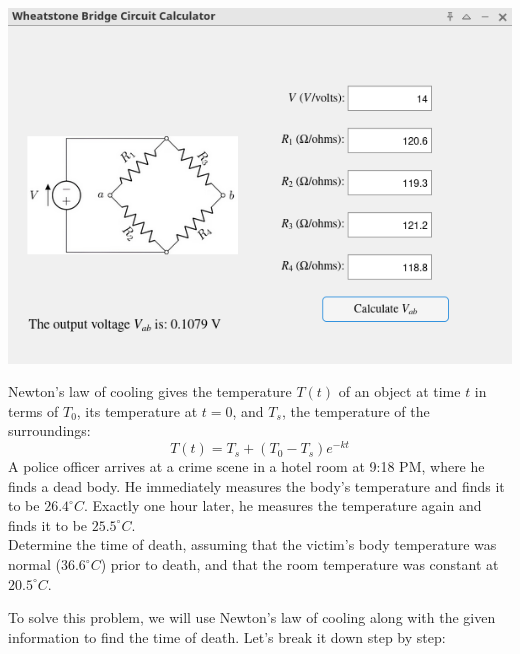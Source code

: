\documentclass[a4paper, 12pt]{report}
\def\link{blue!50!black}
\begin{document}
    
    \includegraphics[scale=0.5]{images/wheat.png}
    
    \newpage
    
    \begin{tcolorbox}[title={\color{black}{\section{Q2}}}, colback=white, colframe=black!30!white, boxrule=0.4mm, width=1\textwidth]
        \centering
        Newton's law of cooling gives the temperature \( T(t) \) of an object at time \( t \) in terms of \( T_0 \), its temperature at \( t = 0 \), and \( T_s \), the temperature of the surroundings:
        \[
        T(t) = T_s + (T_0 - T_s)e^{-kt}
        \]
        A police officer arrives at a crime scene in a hotel room at 9:18 PM, where he finds a dead body. He immediately measures the body's temperature and finds it to be \( 26.4^\circ C \). Exactly one hour later, he measures the temperature again and finds it to be \( 25.5^\circ C \).\\[6pt]
        Determine the time of death, assuming that the victim's body temperature was normal (\( 36.6^\circ C \)) prior to death, and that the room temperature was constant at \( 20.5^\circ C \).
    \end{tcolorbox}
    
    To solve this problem, we will use Newton's law of cooling along with the given information to find the time of death. Let's break it down step by step:
    
\end{document}
